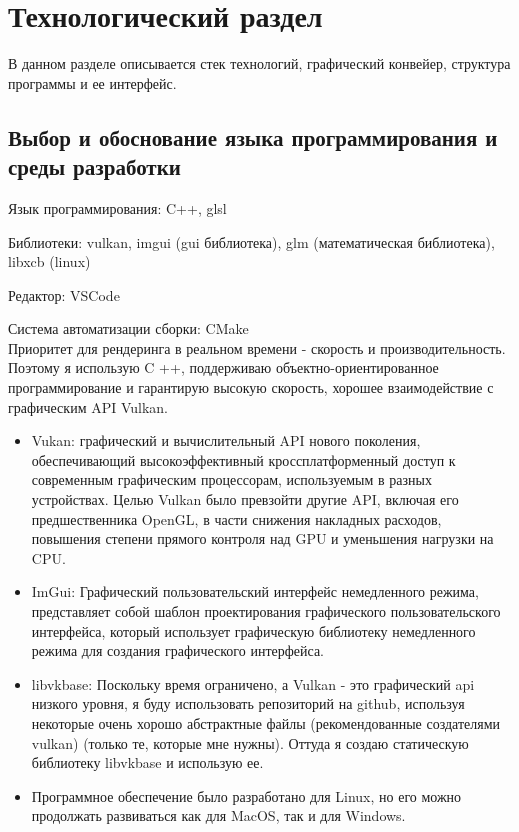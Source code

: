 \chapter{Технологический раздел}
\label{cha:impl}

В данном разделе описывается стек технологий, графический конвейер, структура программы и ее интерфейс.

\section{Выбор и обоснование языка программирования и среды разработки}

Язык программирования: C++, glsl

Библиотеки: vulkan, imgui (gui библиотека), glm (математическая библиотека), libxcb (linux)

Редактор: VSCode

Система автоматизации сборки: CMake
\\

Приоритет для рендеринга в реальном времени - скорость и производительность.
Поэтому я использую C ++, поддерживаю объектно-ориентированное программирование и гарантирую высокую скорость, хорошее взаимодействие с графическим API Vulkan.



\begin{itemize}
    \item Vukan: графический и вычислительный API нового поколения,
    обеспечивающий высокоэффективный кроссплатформенный доступ к
    современным графическим процессорам, используемым в разных устройствах.
    Целью Vulkan было превзойти другие API, включая его предшественника OpenGL,
    в части снижения накладных расходов, повышения степени прямого контроля над GPU и уменьшения нагрузки на CPU.

    \item ImGui: Графический пользовательский интерфейс немедленного режима,
    представляет собой шаблон проектирования графического пользовательского интерфейса,
    который использует графическую библиотеку немедленного режима
    для создания графического интерфейса.

    \item libvkbase: Поскольку время ограничено, а Vulkan - это графический api
    низкого уровня, я буду использовать репозиторий на github, используя некоторые
    очень хорошо абстрактные файлы (рекомендованные создателями vulkan)
    (только те, которые мне нужны). Оттуда я создаю статическую библиотеку libvkbase и использую ее.
    
    \item Программное обеспечение было разработано для Linux, но его можно
    продолжать развиваться как для MacOS, так и для Windows.
\end{itemize}

